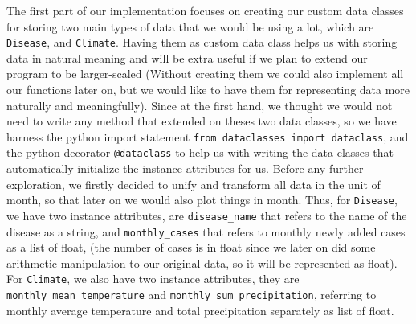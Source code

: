 \documentclass[fontsize=11pt]{article}
\begin{document}
The first part of our implementation focuses on creating our custom data classes for storing two main types of data that we would be using a lot, which are \texttt{Disease}, and \texttt{Climate}. Having them as custom data class helps us with storing data in natural meaning and will be extra useful if we plan to extend our program to be larger-scaled (Without creating them we could also implement all our functions later on, but we would like to have them for representing data more naturally and meaningfully). Since at the first hand, we thought we would not need to write any method that extended on theses two data classes, so we have harness the python import statement \texttt{from dataclasses import dataclass}, and the python decorator \texttt{@dataclass} to help us with writing the data classes that automatically initialize the instance attributes for us. Before any further exploration, we firstly decided to unify and transform all data in the unit of month, so that later on we would also plot things in month. Thus, for \texttt{Disease}, we have two instance attributes, are \texttt{disease\_name} that refers to the name of the disease as a string, and \texttt{monthly\_cases} that refers to monthly newly added cases as a list of float, (the number of cases is in float since we later on did some arithmetic manipulation to our original data, so it will be represented as float). For \texttt{Climate}, we also have two instance attributes, they are \texttt{monthly\_mean\_temperature} and \texttt{monthly\_sum\_precipitation}, referring to monthly average temperature and total precipitation separately as list of float.
\end{document}
